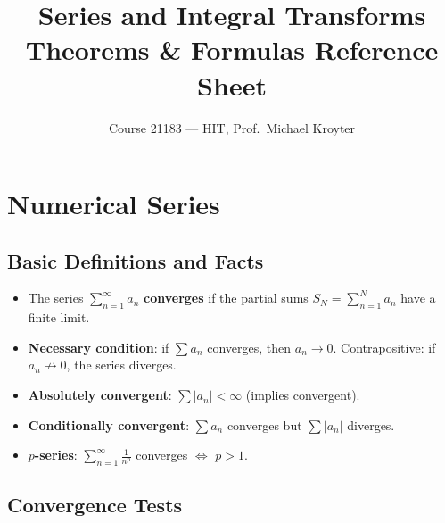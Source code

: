 \documentclass[12pt, a4paper]{article}
\title{\textbf{Series and Integral Transforms}\\[0.5em]
\large Theorems \& Formulas Reference Sheet}
\author{Course 21183 --- HIT, Prof.\ Michael Kroyter}
\date{}
\theoremstyle{definition}
\theoremstyle{remark}
\begin{document}
\maketitle
\tableofcontents
\newpage

\section{Numerical Series}

\subsection{Basic Definitions and Facts}
\begin{itemize}
  \item The series $\displaystyle\sum_{n=1}^\infty a_n$ \textbf{converges} if the partial sums
        $S_N = \sum_{n=1}^N a_n$ have a finite limit.
  \item \textbf{Necessary condition}: if $\sum a_n$ converges, then $a_n \to 0$.
        Contrapositive: if $a_n \not\to 0$, the series diverges.
  \item \textbf{Absolutely convergent}: $\sum |a_n| < \infty$ (implies convergent).
  \item \textbf{Conditionally convergent}: $\sum a_n$ converges but $\sum |a_n|$ diverges.
  \item \textbf{$p$-series}: $\displaystyle\sum_{n=1}^\infty \frac{1}{n^p}$ converges $\Leftrightarrow$ $p > 1$.
\end{itemize}

\subsection{Convergence Tests}
\end{document}
